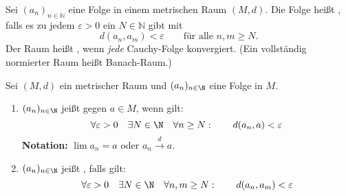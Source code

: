 Sei $(a_n)_{n \in \mathbb{N}}$ eine Folge in einem metrischen Raum $(M, d)$. Die Folge heißt , falls es zu jedem $\varepsilon > 0$ ein $N \in \mathbb{N}$ gibt mit 
$$d(a_n, a_m) < \varepsilon \qquad \text{für alle $n, m \geq N$.}$$
Der Raum heißt , wenn \textit{jede} Cauchy-Folge konvergiert. (Ein vollständig normierter Raum heißt Banach-Raum.)

Sei $(M, d)$ ein metrischer Raum und $(a_n)_{n \in \N}$ eine Folge in $M$.
\begin{enumerate}
    \item $(a_n)_{n \in \N}$ jeißt  gegen $a \in M$, wenn gilt:
    $$\forall \varepsilon > 0 \quad \exists N \in \N \quad \forall n \geq N : \qquad d(a_n, a) < \varepsilon$$
    \textbf{Notation:} $\lim a_n = a$ oder $a_n \xrightarrow{d} a$.
    \item $(a_n)_{n \in \N}$ jeißt , falls gilt:
    $$\forall \varepsilon > 0 \quad \exists N \in \N \quad \forall n, m \geq N : \qquad d(a_n, a_m) < \varepsilon$$
\end{enumerate}
